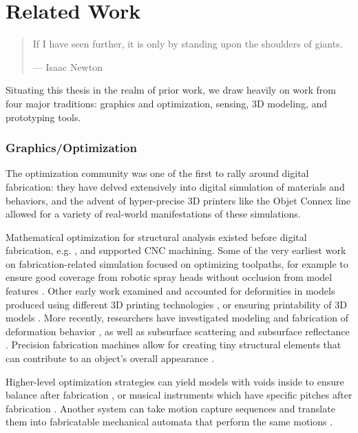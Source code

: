\chapter{Related Work}

\begin{quote}
If I have seen further, it is only by standing upon the shoulders of giants.

--- Isaac Newton
\end{quote}

Situating this thesis in the realm of prior work, we draw heavily on work from four major traditions: graphics and optimization, sensing, 3D modeling, and prototyping tools.

\subsection{Graphics/Optimization}

    The optimization community was one of the first to rally around digital fabrication: they have delved extensively into digital simulation of materials and behaviors, and the advent of hyper-precise 3D printers like the Objet Connex line allowed for a variety of real-world manifestations of these simulations.
    
    Mathematical optimization for structural analysis existed before digital fabrication, e.g. \cite{fleury-optimization}, and supported CNC machining. Some of the very earliest work on fabrication-related simulation focused on optimizing toolpaths, for example to ensure good coverage from robotic spray heads without occlusion from model features \cite{gursoz-noodles}. Other early work examined and accounted for deformities in models produced using different 3D printing technologies \cite{brown-simulate,hsu-numerical}, or ensuring printability of 3D models \cite{barequet-gaps,bohn-shellclosure}. More recently, researchers have investigated modeling and fabrication of deformation behavior \cite{bickel-deformation}, as well as subsurface scattering \cite{hasan-subsurface} and subsurface reflectance \cite{weyrich-reflectance}. Precision fabrication machines allow for creating tiny structural elements that can contribute to an object's overall appearance \cite{lan-appearance}.
    
    Higher-level optimization strategies can yield models with voids inside to ensure balance after fabrication \cite{prevost-makeitstand}, or musical instruments which have specific pitches after fabrication \cite{umetani-metallophone}. Another system can take motion capture sequences and translate them into fabricatable mechanical automata that perform the same motions \cite{ceylan-automata}.
    
